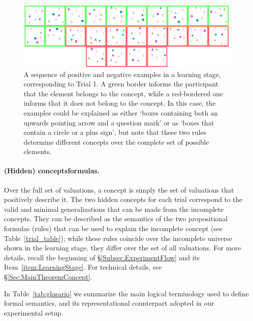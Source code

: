 \begin{figure}[h!] 
\begin{center}
    	\includegraphics[scale=0.35]{papers/images_behavior_research_methods/Learning.PNG}
	\caption{A sequence of positive and negative examples in a learning stage, corresponding to Trial 1.  A green border informs the participant that the element belongs to the concept, while a red-bordered one informs that it does not belong to the concept. In this case, the examples could be explained as either `boxes containing both an upwards pointing arrow and a question mark' or as `boxes that contain a circle or a plus sign', but note that these two rules determine different concepts over the complete set of possible elements.}
	\label{Figure:training}
\end{center}
\end{figure}

\paragraph{(Hidden) concepts\textemdash formulas.}
Over the full set of valuations, a concept is simply the set of valuations that positively describe it. The two hidden concepts for each trial correspond to the valid and minimal generalizations that can be made from the incomplete concepts. They can be described as the semantics of the two propositional formulas (rules) that can be used to explain the incomplete concept (see Table~\ref{trial_table}); while these rules coincide over the incomplete universe shown in the learning stage, they differ over the set of all valuations. For more details, recall the beginning of \S\ref{Subsec:ExperimentFlow} and its Item~\ref{item:LearningStage}. For technical details, see \S\ref{Sec:MainTheoremConcept}.

\bigskip

In Table~\ref{tab:glosario} we summarize the main logical terminology used to define formal semantics, and its representational counterpart adopted in our experimental setup.

